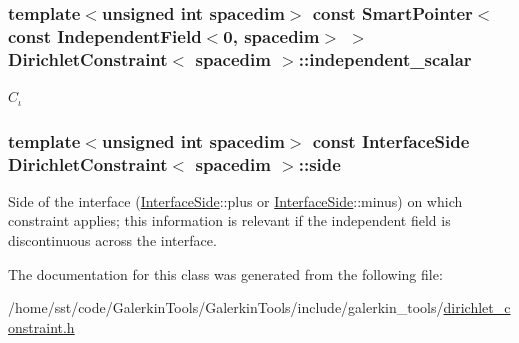 \subsubsection[{\texorpdfstring{independent\+\_\+scalar}{independent_scalar}}]{\setlength{\rightskip}{0pt plus 5cm}template$<$unsigned int spacedim$>$ const {\bf Smart\+Pointer}$<$const {\bf Independent\+Field}$<$0, spacedim$>$ $>$ {\bf Dirichlet\+Constraint}$<$ spacedim $>$\+::independent\+\_\+scalar}\hypertarget{class_dirichlet_constraint_a8793f0d41a9c6e88638d7cf5d52a6fdd}{}\label{class_dirichlet_constraint_a8793f0d41a9c6e88638d7cf5d52a6fdd}
$C_\iota$ 
\subsubsection[{\texorpdfstring{side}{side}}]{\setlength{\rightskip}{0pt plus 5cm}template$<$unsigned int spacedim$>$ const {\bf Interface\+Side} {\bf Dirichlet\+Constraint}$<$ spacedim $>$\+::side}\hypertarget{class_dirichlet_constraint_ae049d107664d3bf23d287ec77545b6f3}{}\label{class_dirichlet_constraint_ae049d107664d3bf23d287ec77545b6f3}
Side of the interface (\hyperlink{triangulation__system_8h_a44f3c00e36c1d6e3c389ae693c09b435}{Interface\+Side}\+:\+:{\ttfamily plus} or \hyperlink{triangulation__system_8h_a44f3c00e36c1d6e3c389ae693c09b435}{Interface\+Side}\+:\+:{\ttfamily minus}) on which constraint applies; this information is relevant if the independent field is discontinuous across the interface. 

The documentation for this class was generated from the following file\+:\begin{DoxyCompactItemize}
\item 
/home/sst/code/\+Galerkin\+Tools/\+Galerkin\+Tools/include/galerkin\+\_\+tools/\hyperlink{dirichlet__constraint_8h}{dirichlet\+\_\+constraint.\+h}\end{DoxyCompactItemize}
